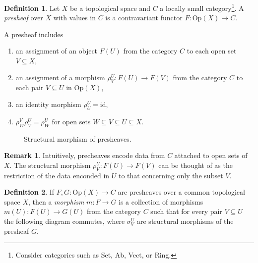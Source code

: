 \documentclass{article}
\theoremstyle{definition}
\newtheorem{definition}{Definition}
\newtheorem*{remark}{Remark}
\begin{document}
\begin{definition}
    Let $X$ be a topological space and $C$ a locally small category\footnote{Consider categories such as Set, Ab, Vect, or Ring.}. A \emph{presheaf} over $X$ with values in $C$ is a contravariant functor $F:\text{Op}(X) \rightarrow C$.

A presheaf includes
\begin{enumerate}
    \item an assignment of an object $F(U)$ from the category $C$ to each open set $V \subseteq X$,
    \item an assignment of a morphism $\rho_V^U: F(U) \rightarrow F(V)$ from the category $C$ to each pair $V \subseteq U$ in Op$(X)$,
    \item an identity morphism $\rho_U^U = \text{id}$,
    \item $\rho_W^V \rho_V^U= \rho_W^U$ for open sets $W \subseteq V \subseteq U \subseteq X$.
\end{enumerate}

\begin{figure}[h]
    \centering
    \caption{Structural morphism of presheaves.}
\end{figure}
\end{definition}

\begin{remark}
    Intuitively, precheaves encode data from $C$ attached to open sets of $X$. The structural morphism $\rho_V^U: F(U) \rightarrow F(V)$ can be thought of as the restriction of the data enconded in $U$ to that concerning only the subset $V$.
\end{remark}

\begin{definition}
    If $F, G: \text{Op}(X) \rightarrow C$ are presheaves over a common topological space $X$, then a \emph{morphism} $m: F \rightarrow G$ is a collection of morphisms $m(U): F(U) \rightarrow G(U)$ from the category $C$ such that for every pair $V \subseteq U$ the following diagram commutes, where $\sigma_V^U$ are structural morphisms of the presheaf $G$.
\end{definition}

\begin{figure}[ht]
    \centering
\end{figure}
\end{document}
